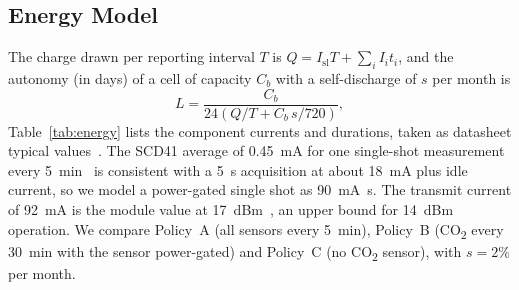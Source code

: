 \documentclass[conference]{IEEEtran}
\newcommand{\COtwo}{CO\textsubscript{2}}
\begin{document}
\subsection{Energy Model}\label{sec:m-energy}
The charge drawn per reporting interval $T$ is $Q = I_\mathrm{sl}T + \sum_i I_i t_i$, and the autonomy (in days) of a cell of capacity $C_b$ with a self-discharge of $s$ per month is
\begin{equation}
L = \frac{C_b}{24\left(Q/T + C_b\, s/720\right)},
\label{eq:life}
\end{equation}
Table~\ref{tab:energy} lists the component currents and durations, taken as datasheet typical values~\cite{scd4xds,ds18b20ds,bme688ds,hx711ds,inmp441ds,tmp117ds,rak4631ds}. The SCD41 average of \SI{0.45}{mA} for one single-shot measurement every \SI{5}{min}~\cite{scd4xds} is consistent with a \SI{5}{s} acquisition at about \SI{18}{mA} plus idle current, so we model a power-gated single shot as \SI{90}{mA.s}. The transmit current of \SI{92}{mA} is the module value at \SI{+17}{dBm}~\cite{rak4631ds}, an upper bound for \SI{+14}{dBm} operation. We compare Policy~A (all sensors every \SI{5}{min}), Policy~B (\COtwo{} every \SI{30}{min} with the sensor power-gated) and Policy~C (no \COtwo{} sensor), with $s = 2\%$ per month.
\end{document}
